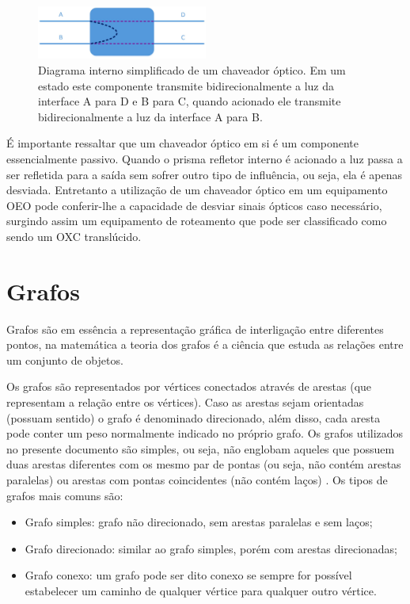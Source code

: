 \begin{figure}[!htb]
	\centering
	\includegraphics[width=0.5\textwidth]{./figuras/Switch_optico.jpg} %
	\caption[Exemplo básico chaveador óptico]{Diagrama interno simplificado de um chaveador óptico. Em um estado este componente transmite bidirecionalmente a luz da interface A para D e B para C, quando acionado ele transmite bidirecionalmente a luz da interface A para B.}
	\label{fig_chaveador_optico}
\end{figure}

É importante ressaltar que um chaveador óptico em si é um componente essencialmente passivo. Quando o prisma refletor interno é acionado a luz passa a ser refletida para a saída sem sofrer outro tipo de influência, ou seja, ela é apenas desviada. Entretanto a utilização de um chaveador óptico em um equipamento OEO pode conferir-lhe a capacidade de desviar sinais ópticos caso necessário, surgindo assim um equipamento de roteamento que pode ser classificado como sendo um OXC translúcido. 

\section{Grafos}
\label{chap_grafos}
Grafos são em essência a representação gráfica de interligação entre diferentes pontos, na matemática a teoria dos grafos é a ciência que estuda as relações entre um conjunto de objetos.

Os grafos são representados por vértices conectados através de arestas (que representam a relação entre os vértices). Caso as arestas sejam orientadas (possuam sentido) o grafo é denominado direcionado, além disso, cada aresta pode conter um peso normalmente indicado no próprio grafo. Os grafos utilizados no presente documento são simples, ou seja, não englobam aqueles que possuem duas arestas diferentes com os mesmo par de pontas (ou seja, não contém arestas paralelas) ou arestas com pontas coincidentes (não contém laços) \cite{Man-Feofiloff2011}. Os tipos de grafos mais comuns são:

\begin{itemize}
	\item Grafo simples: grafo não direcionado, sem arestas paralelas e sem laços;
	\item Grafo direcionado: similar ao grafo simples, porém com arestas direcionadas;
	\item Grafo conexo: um grafo pode ser dito conexo se sempre for possível estabelecer um caminho de qualquer vértice para qualquer outro vértice.
\end{itemize}


